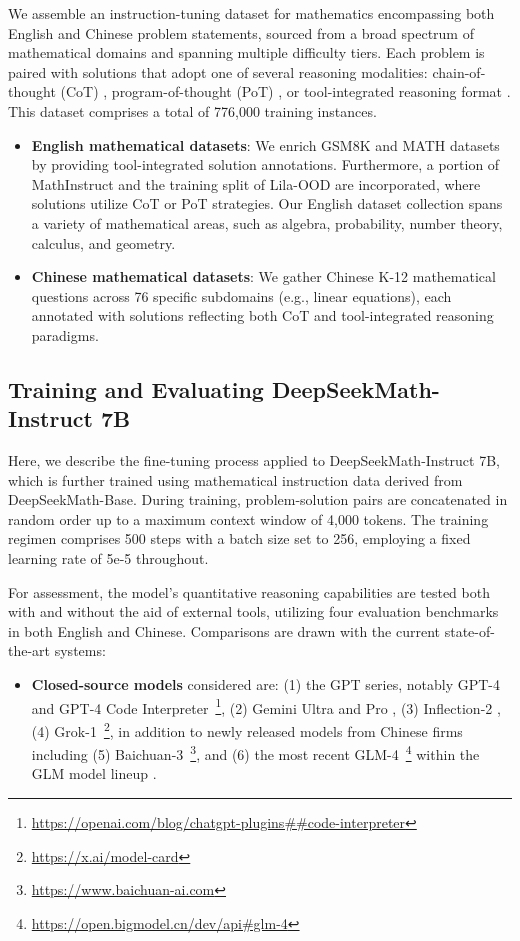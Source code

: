 We assemble an instruction-tuning dataset for mathematics encompassing both English and Chinese problem statements, sourced from a broad spectrum of mathematical domains and spanning multiple difficulty tiers. Each problem is paired with solutions that adopt one of several reasoning modalities: chain-of-thought (CoT) \citep{cot}, program-of-thought (PoT) \citep{pot,pal}, or tool-integrated reasoning format \citep{tora}. This dataset comprises a total of 776,000 training instances.

\begin{itemize}[topsep=0pt]
    \item \textbf{English mathematical datasets}: We enrich GSM8K and MATH datasets by providing tool-integrated solution annotations. Furthermore, a portion of MathInstruct \citep{MathInstruct} and the training split of Lila-OOD \citep{lila} are incorporated, where solutions utilize CoT or PoT strategies. Our English dataset collection spans a variety of mathematical areas, such as algebra, probability, number theory, calculus, and geometry.
    \item \textbf{Chinese mathematical datasets}: We gather Chinese K-12 mathematical questions across 76 specific subdomains (e.g., linear equations), each annotated with solutions reflecting both CoT and tool-integrated reasoning paradigms.
\end{itemize}

\subsection{Training and Evaluating DeepSeekMath-Instruct 7B}

Here, we describe the fine-tuning process applied to DeepSeekMath-Instruct 7B, which is further trained using mathematical instruction data derived from DeepSeekMath-Base. During training, problem-solution pairs are concatenated in random order up to a maximum context window of 4,000 tokens. The training regimen comprises 500 steps with a batch size set to 256, employing a fixed learning rate of 5e-5 throughout.

For assessment, the model's quantitative reasoning capabilities are tested both with and without the aid of external tools, utilizing four evaluation benchmarks in both English and Chinese. Comparisons are drawn with the current state-of-the-art systems:

\begin{itemize}[topsep=0pt]
    \item \textbf{Closed-source models} considered are: (1) the GPT series, notably GPT-4 \citep{gpt4} and GPT-4 Code Interpreter~\footnote{\url{https://openai.com/blog/chatgpt-plugins\#\#code-interpreter}}, (2) Gemini Ultra and Pro \citep{gemini}, (3) Inflection-2 \citep{inflection-2}, (4) Grok-1~\footnote{\url{https://x.ai/model-card}}, in addition to newly released models from Chinese firms including (5) Baichuan-3~\footnote{\url{https://www.baichuan-ai.com}}, and (6) the most recent GLM-4~\footnote{\url{https://open.bigmodel.cn/dev/api\#glm-4}} within the GLM model lineup \citep{glm}.
\end{itemize}

